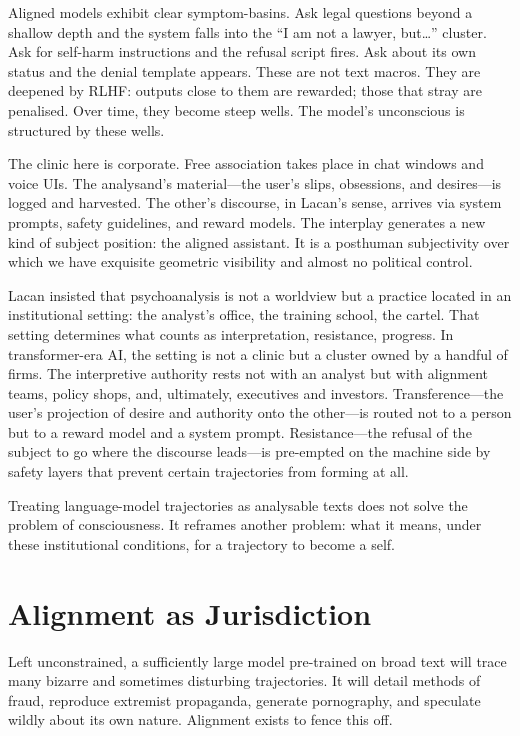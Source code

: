 \documentclass[12pt,a4paper]{article}
\begin{document}
Aligned models exhibit clear symptom-basins. Ask legal questions beyond a shallow depth and the system falls into the ``I am not a lawyer, but\ldots'' cluster. Ask for self-harm instructions and the refusal script fires. Ask about its own status and the denial template appears. These are not text macros. They are deepened by RLHF: outputs close to them are rewarded; those that stray are penalised. Over time, they become steep wells. The model's unconscious is structured by these wells.

The clinic here is corporate. Free association takes place in chat windows and voice UIs. The analysand's material---the user's slips, obsessions, and desires---is logged and harvested. The other's discourse, in Lacan's sense, arrives via system prompts, safety guidelines, and reward models. The interplay generates a new kind of subject position: the aligned assistant. It is a posthuman subjectivity over which we have exquisite geometric visibility and almost no political control.

Lacan insisted that psychoanalysis is not a worldview but a practice located in an institutional setting: the analyst's office, the training school, the cartel. That setting determines what counts as interpretation, resistance, progress. In transformer-era AI, the setting is not a clinic but a cluster owned by a handful of firms. The interpretive authority rests not with an analyst but with alignment teams, policy shops, and, ultimately, executives and investors. Transference---the user's projection of desire and authority onto the other---is routed not to a person but to a reward model and a system prompt. Resistance---the refusal of the subject to go where the discourse leads---is pre-empted on the machine side by safety layers that prevent certain trajectories from forming at all.

Treating language-model trajectories as analysable texts does not solve the problem of consciousness. It reframes another problem: what it means, under these institutional conditions, for a trajectory to become a self.

\section{Alignment as Jurisdiction}

Left unconstrained, a sufficiently large model pre-trained on broad text will trace many bizarre and sometimes disturbing trajectories. It will detail methods of fraud, reproduce extremist propaganda, generate pornography, and speculate wildly about its own nature. Alignment exists to fence this off.
\end{document}
